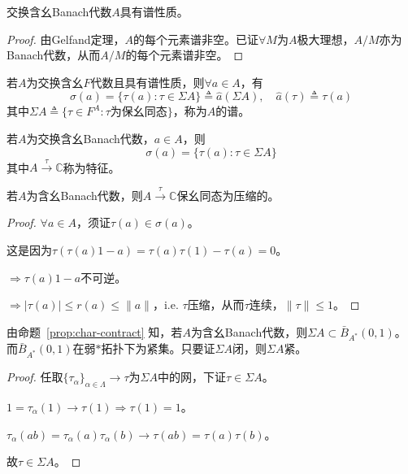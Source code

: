 \documentclass[lang=cn,a4paper,newtx,section]{elegantbook}
\begin{document}
\begin{theorem}
  交换含幺Banach代数$A$具有谱性质。
\end{theorem}

\begin{proof}
  由Gelfand定理，$A$的每个元素谱非空。已证$\forall M$为$A$极大理想，$A/M$亦为Banach代数，从而$A/M$的每个元素谱非空。
\end{proof}

\begin{theorem}
  若$A$为交换含幺$F$代数且具有谱性质，则$\forall a \in A$，有
  \begin{equation*}
    \sigma(a) = \{\tau(a) : \tau \in \Sigma A\} \triangleq \hat{a}(\Sigma A), \quad \hat{a}(\tau) \triangleq \tau(a)
  \end{equation*}
  其中$\Sigma A \triangleq \{\tau \in F^A : \tau\text{为保幺同态}\}$，称为$A$的谱。
\end{theorem}

\begin{corollary}[Gelfand]
  若$A$为交换含幺Banach代数，$a \in A$，则
  \begin{equation*}
    \sigma(a) = \{\tau(a) : \tau \in \Sigma A\}
  \end{equation*}
  其中$A \xrightarrow{\tau} \mathbb{C}$称为特征。
\end{corollary}

\begin{proposition}\label{prop:char-contract}
  若$A$为含幺Banach代数，则$A \xrightarrow{\tau} \mathbb{C}$保幺同态为压缩的。
\end{proposition}

\begin{proof}
  $\forall a \in A$，须证$\tau(a) \in \sigma(a)$。
  
  这是因为$\tau(\tau(a)1 - a) = \tau(a)\tau(1) - \tau(a) = 0$。
  
  $\Rightarrow \tau(a)1 - a$不可逆。
  
  $\Rightarrow |\tau(a)| \leq r(a) \leq \|a\|$，i.e. $\tau$压缩，从而$\tau$连续，$\|\tau\| \leq 1$。
\end{proof}

\begin{proposition}
  由命题~\ref{prop:char-contract} 知，若$A$为含幺Banach代数，则$\Sigma A \subset \bar{B}_{A^*}(0, 1)$。而$\bar{B}_{A^*}(0, 1)$在弱$*$拓扑下为紧集。只要证$\Sigma A$闭，则$\Sigma A$紧。
\end{proposition}

\begin{proof}
  任取$\{\tau_\alpha\}_{\alpha \in \Lambda} \longrightarrow \tau$为$\Sigma A$中的网，下证$\tau \in \Sigma A$。
  
  $1 = \tau_\alpha(1) \longrightarrow \tau(1) \Rightarrow \tau(1) = 1$。
  
  $\tau_\alpha(ab) = \tau_\alpha(a)\tau_\alpha(b) \longrightarrow \tau(ab) = \tau(a)\tau(b)$。
  
  故$\tau \in \Sigma A$。
\end{proof}
\end{document}
